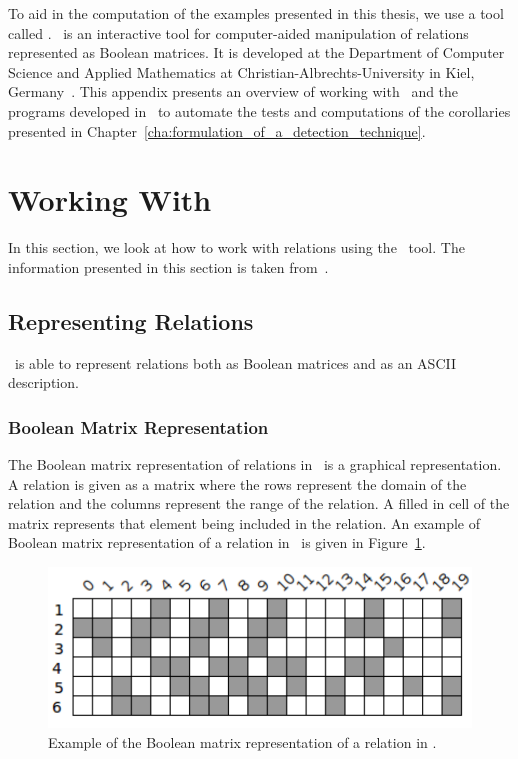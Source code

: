 To aid in the computation of the examples presented in this thesis, we use a tool called \relview. \relview\index{\relview}\ is an interactive tool for computer-aided manipulation of relations represented as Boolean matrices. It is developed at the Department of Computer Science and Applied Mathematics at Christian-Albrechts-University in Kiel, Germany~\cite{relview}. This appendix presents an overview of working with \relview\ and the programs developed in \relview\ to automate the tests and computations of the corollaries presented in Chapter~\ref{cha:formulation_of_a_detection_technique}.

\section{Working With \relview}
\label{sec:working_with_relview}

In this section, we look at how to work with relations using the \relview\ tool. The information presented in this section is taken from~\cite{Behnke2009aa}.

\subsection{Representing Relations}
\label{sub:representing_relations}

\relview\ is able to represent relations both as Boolean matrices and as an ASCII description.

\subsubsection{Boolean Matrix Representation}
\label{ssub:boolean_matrix_representation}

The Boolean matrix representation of relations in \relview\ is a graphical representation. A relation is given as a matrix where the rows represent the domain of the relation and the columns represent the range of the relation. A filled in cell of the matrix represents that element being included in the relation. An example of Boolean matrix representation of a relation in \relview\ is given in Figure~\ref{fig:matrix_example}. \newline

\begin{figure}[ht]
	\centering
	\includegraphics[scale=0.65]{Figures/PDF/Relview/NoiseQ.pdf}
	\caption{Example of the Boolean matrix representation of a relation in \relview.}
	\label{fig:matrix_example}
\end{figure}

